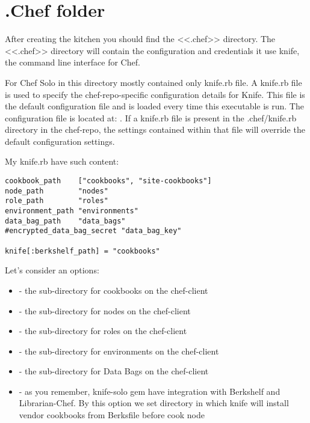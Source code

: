\section{.Chef folder}
\label{sec:solo-chef-folder}

After creating the kitchen you should find the <<.chef>> directory. The <<.chef>> directory will contain the configuration and credentials it use knife, the command line interface for Chef.

For Chef Solo in this directory mostly contained only knife.rb file. A knife.rb file is used to specify the chef-repo-specific configuration details for Knife. This file is the default configuration file and is loaded every time this executable is run. The configuration file is located at: . If a knife.rb file is present in the .chef/knife.rb directory in the chef-repo, the settings contained within that file will override the default configuration settings.

My knife.rb have such content:

\begin{lstlisting}[label=lst:my-cloud-chef-filder1,title=my-cloud/.chef/knife.rb]
cookbook_path    ["cookbooks", "site-cookbooks"]
node_path        "nodes"
role_path        "roles"
environment_path "environments"
data_bag_path    "data_bags"
#encrypted_data_bag_secret "data_bag_key"

knife[:berkshelf_path] = "cookbooks"
\end{lstlisting}

Let's consider an options:

\begin{itemize}
  \item {} - the sub-directory for cookbooks on the chef-client
  \item {} - the sub-directory for nodes on the chef-client
  \item {} - the sub-directory for roles on the chef-client
  \item {} - the sub-directory for environments on the chef-client
  \item {} - the sub-directory for Data Bags on the chef-client
  \item {} - as you remember, knife-solo gem have integration with Berkshelf and Librarian-Chef. By this option we set directory in which knife will install vendor cookbooks from Berksfile before cook node
\end{itemize}
